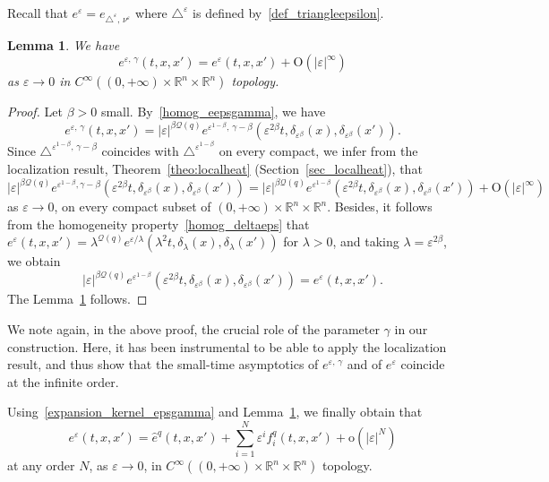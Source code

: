 \documentclass[10pt]{amsart}
\newtheorem{lemm}[theo]{Lemma}\newtheorem{prop}[theo]{Proposition}\newtheorem{coro}[theo]{Corollary}\newtheorem{conj}[theo]{Conjecture}
\theoremstyle{definition}\newtheorem{defi}[theo]{Definition}\newtheorem{rema}[theo]{Remark}\newtheorem{exam}[theo]{Example}\newtheorem{exem}[theo]{Example}\newtheorem{nota}[theo]{Notation}
\newcommand*\R{\mathbb{R}}
\newcommand{\calQ}{\mathcal{Q}}
\newcommand{\rmo}{\mathrm{o}}
\newcommand{\rmO}{\mathrm{O}}
\begin{document}
Recall that $e^\varepsilon = e_{\triangle^\varepsilon,\,\nu^\varepsilon}$ where $\triangle^\varepsilon$ is defined by~\eqref{def_triangleepsilon}.

\begin{lemm}\label{lem_eepsgamma_eeps}
We have
\[
e^{\varepsilon,\,\gamma}(t,x,x') = e^\varepsilon(t,x,x') + \rmO(\vert\varepsilon\vert^\infty)
\]
as $\varepsilon\rightarrow 0$ in $C^\infty((0,+\infty)\times\R^n\times\R^n)$ topology.
\end{lemm}

\begin{proof}
Let $\beta>0$ small. By~\eqref{homog_eepsgamma}, we have
\[
e^{\varepsilon,\,\gamma}(t,x,x') = \vert\varepsilon\vert^{\beta\calQ(q)} e^{\varepsilon^{1-\beta},\,\gamma-\beta} \left(\varepsilon^{2\beta} t, \delta_{\varepsilon^\beta}(x), \delta_{\varepsilon^\beta}(x')\right).
\]
Since $\triangle^{\varepsilon^{1-\beta},\,\gamma-\beta}$ coincides with $\triangle^{\varepsilon^{1-\beta}}$ on every compact, we infer from the localization result, Theorem~\ref{theo:localheat} (Section~\ref{sec_localheat}), that
\[
\vert\varepsilon\vert^{\beta\calQ(q)} e^{\varepsilon^{1-\beta},\gamma-\beta} \left(\varepsilon^{2\beta} t, \delta_{\varepsilon^\beta}(x), \delta_{\varepsilon^\beta}(x')\right) = \vert\varepsilon\vert^{\beta\calQ(q)} e^{\varepsilon^{1-\beta}}\left(\varepsilon^{2\beta} t, \delta_{\varepsilon^\beta}(x), \delta_{\varepsilon^\beta}(x')\right) + \rmO(\vert\varepsilon\vert^\infty)
\]
as $\varepsilon\rightarrow 0$, on every compact subset of $(0,+\infty)\times\R^n\times\R^n$. Besides, it follows from the homogeneity property~\eqref{homog_deltaeps} that $e^\varepsilon(t,x,x') = \lambda^{\calQ(q)} e^{\varepsilon/\lambda}(\lambda^2 t,\delta_\lambda(x),\delta_\lambda(x'))$ for $\lambda>0$, and taking $\lambda=\varepsilon^{2\beta}$, we obtain
\[
\vert\varepsilon\vert^{\beta\calQ(q)} e^{\varepsilon^{1-\beta}}\left(\varepsilon^{2\beta} t, \delta_{\varepsilon^\beta}(x), \delta_{\varepsilon^\beta}(x')\right) = e^\varepsilon(t,x,x').
\]
The Lemma~\ref{lem_eepsgamma_eeps} follows.
\end{proof}

We note again, in the above proof, the crucial role of the parameter $\gamma$ in our construction. Here, it has been instrumental to be able to apply the localization result, and thus show that the small-time asymptotics of $e^{\varepsilon,\,\gamma}$ and of $e^\varepsilon$ coincide at the infinite order.

Using~\eqref{expansion_kernel_epsgamma} and Lemma~\ref{lem_eepsgamma_eeps}, we finally obtain that
\[
e^\varepsilon(t,x,x') = \widehat{e}^{q}(t,x,x') + \sum_{i=1}^N \varepsilon^i f_i^{q}(t,x,x') +\rmo\left(\vert\varepsilon\vert^N\right)
\]
at any order $N$, as $\varepsilon\rightarrow 0$, in $C^\infty((0,+\infty)\times\R^n\times\R^n)$ topology.
\end{document}
